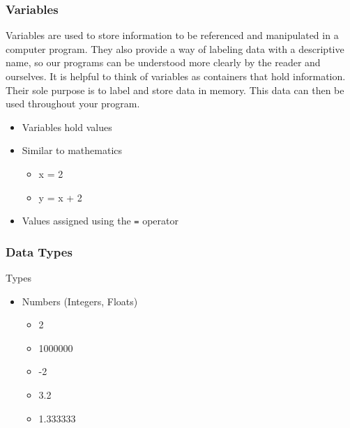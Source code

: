 \documentclass[10pt, a4paper]{beamer} %
\begin{document}
\begin{frame}\frametitle{Variables}

	Variables are used to store information to be referenced and manipulated in a computer program.
	They also provide a way of labeling data with a descriptive name, so our programs can be understood more clearly by the reader and ourselves.
	It is helpful to think of variables as containers that hold information.
	Their sole purpose is to label and store data in memory.
	This data can then be used throughout your program.

	\begin{itemize}
		\item Variables hold values
		\item Similar to mathematics
		      \begin{itemize}
			      \item x = 2
			      \item y = x + 2
		      \end{itemize}
		\item Values assigned using the \texttt{=} operator
	\end{itemize}
\end{frame}

\begin{frame}[c]\frametitle{Data Types}
	\begin{block}{Types}
		\begin{itemize}
			\item Numbers (Integers, Floats)
			      \begin{itemize}
				      \item 2
				      \item 1000000
				      \item -2
				      \item 3.2
				      \item 1.333333
			      \end{itemize}
		\end{itemize}
	\end{block}

\end{frame}
\end{document}
